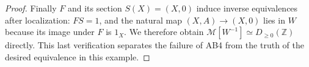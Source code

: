 \begin{proof}
Finally $F$ and its section $S(X)=(X,0)$ induce inverse equivalences after localization: $FS=1$, and the natural map $(X,A)\to(X,0)$ lies in $W$ because its image under $F$ is $1_X$. We therefore obtain $\mathcal M[W^{-1}]\simeq D_{\geq0}(\mathbb Z)$ directly. This last verification separates the failure of AB4 from the truth of the desired equivalence in this example.
\end{proof}

